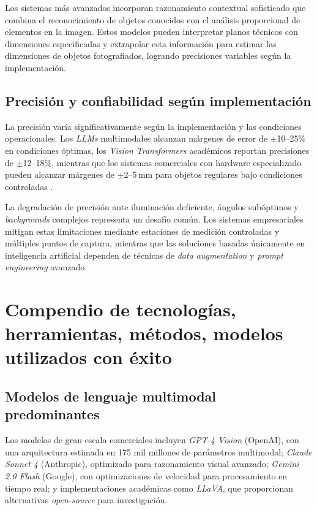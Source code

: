 Los sistemas más avanzados incorporan razonamiento contextual sofisticado que combina el reconocimiento de objetos conocidos con el análisis proporcional de elementos en la imagen. Estos modelos pueden interpretar planos técnicos con dimensiones especificadas y extrapolar esta información para estimar las dimensiones de objetos fotografiados, logrando precisiones variables según la implementación.


\subsection{Precisión y confiabilidad según implementación}

La precisión varía significativamente según la implementación y las condiciones operacionales. Los \textit{LLMs} multimodales alcanzan márgenes de error de $\pm$10--25\% en condiciones óptimas, los \textit{Vision Transformers} académicos reportan precisiones de $\pm$12--18\%, mientras que los sistemas comerciales con hardware especializado pueden alcanzar márgenes de $\pm$2--5\,mm para objetos regulares bajo condiciones controladas \cite{Dosovitskiy2020, Anthopic2025, Oquab2024}.

La degradación de precisión ante iluminación deficiente, ángulos subóptimos y \textit{backgrounds} complejos representa un desafío común. Los sistemas empresariales mitigan estas limitaciones mediante estaciones de medición controladas y múltiples puntos de captura, mientras que las soluciones basadas únicamente en inteligencia artificial dependen de técnicas de \textit{data augmentation} y \textit{prompt engineering} avanzado.

\section{Compendio de tecnologías, herramientas, métodos, modelos utilizados con éxito}

\subsection{Modelos de lenguaje multimodal predominantes}

Los modelos de gran escala comerciales incluyen \textit{GPT-4 Vision} (OpenAI), con una arquitectura estimada en 175 mil millones de parámetros multimodal; \textit{Claude Sonnet 4} (Anthropic), optimizado para razonamiento visual avanzado; \textit{Gemini 2.0 Flash} (Google), con optimizaciones de velocidad para procesamiento en tiempo real; y implementaciones académicas como \textit{LLaVA}, que proporcionan alternativas \textit{open-source} para investigación.

